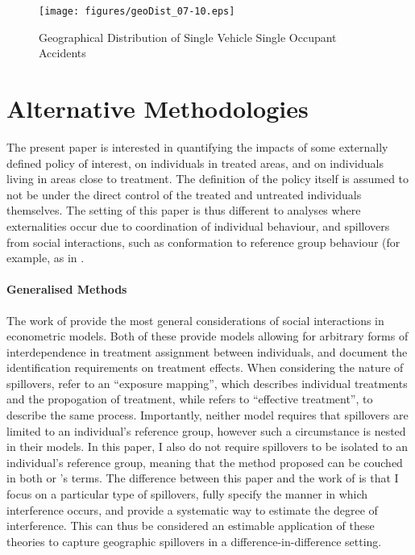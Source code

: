 \documentclass[12pt]{article}
\begin{document}
\begin{spacing}{1.3}
\begin{landscape}
\begin{figure}
  \begin{center}
    \caption{Geographical Distribution of Single Vehicle Single Occupant Accidents}
    \texttt{[image: figures/geoDist\_07-10.eps]}
  \end{center}
\end{figure}
\end{landscape}

\clearpage


\section{Alternative Methodologies}
\label{app:literature}
The present paper is interested in quantifying the impacts of some externally
defined policy of interest, on individuals in treated areas, and on individuals
living in areas close to treatment.  The definition of the policy itself is
assumed to not be under the direct control of the treated and untreated
individuals themselves.  The setting of this paper is thus different to analyses
where externalities occur due to coordination of individual behaviour, and
spillovers from social interactions, such as conformation to reference group
behaviour (for example, as in \citet{BrockDurlauf2001,Benabou1993}.

\paragraph{Generalised Methods} The work of \citet{Manski2013,
  AronowSamii2017} provide the most general considerations of social
interactions in econometric models.  Both of these provide models allowing
for arbitrary forms of interdependence in treatment assignment between
individuals, and document the identification requirements on treatment
effects.  When considering the nature of spillovers, \citet{AronowSamii2017}
refer to an ``exposure mapping'', which describes individual treatments and
the propogation of treatment, while \citet{Manski2013} refers to ``effective
treatment'', to describe the same process. Importantly, neither model
requires that spillovers are limited to an individual's reference group,
however such a circumstance is nested in their models. In this paper, I also
do not require spillovers to be isolated to an individual's reference group,
meaning that the method proposed can be couched in both \citet{Manski2013} or
\citet{AronowSamii2017}'s terms.  The difference between this paper and
the work of \citet{Manski2013,AronowSamii2017} is that I focus on a particular
type of spillovers, fully specify the manner in which interference occurs,
and provide a systematic way to estimate the degree of interference.
This can thus be considered an estimable application of these theories to
capture geographic spillovers in a difference-in-difference setting.


\end{spacing}
\end{document}
